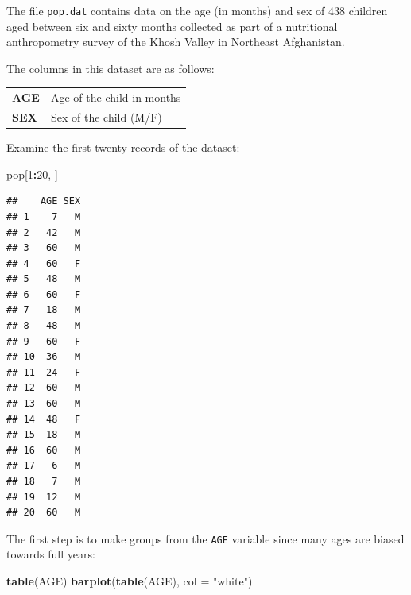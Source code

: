 \documentclass[12pt,a4paper]{book}
\newenvironment{Shaded}{\begin{snugshade}}{\end{snugshade}}
\newcommand{\KeywordTok}[1]{\textcolor[rgb]{0.13,0.29,0.53}{\textbf{#1}}}
\newcommand{\DataTypeTok}[1]{\textcolor[rgb]{0.13,0.29,0.53}{#1}}
\newcommand{\DecValTok}[1]{\textcolor[rgb]{0.00,0.00,0.81}{#1}}
\newcommand{\StringTok}[1]{\textcolor[rgb]{0.31,0.60,0.02}{#1}}
\newcommand{\OperatorTok}[1]{\textcolor[rgb]{0.81,0.36,0.00}{\textbf{#1}}}
\newcommand{\NormalTok}[1]{#1}
\theoremstyle{definition}
\theoremstyle{definition}
\theoremstyle{definition}
\theoremstyle{remark}
\begin{document}
The file \texttt{pop.dat} contains data on the age (in months) and sex
of 438 children aged between six and sixty months collected as part of a
nutritional anthropometry survey of the Khosh Valley in Northeast
Afghanistan.

The columns in this dataset are as follows:

\begin{longtable}[]{@{}ll@{}}
\toprule
\begin{minipage}[t]{0.14\columnwidth}\raggedright
\textbf{AGE}\strut
\end{minipage} & \begin{minipage}[t]{0.38\columnwidth}\raggedright
Age of the child in months\strut
\end{minipage}\tabularnewline
\begin{minipage}[t]{0.14\columnwidth}\raggedright
\textbf{SEX}\strut
\end{minipage} & \begin{minipage}[t]{0.38\columnwidth}\raggedright
Sex of the child (M/F)\strut
\end{minipage}\tabularnewline
\bottomrule
\end{longtable}

Examine the first twenty records of the dataset:

\begin{Shaded}
\begin{Highlighting}[]
\NormalTok{pop[}\DecValTok{1}\OperatorTok{:}\DecValTok{20}\NormalTok{, ]}
\end{Highlighting}
\end{Shaded}

\begin{verbatim}
##    AGE SEX
## 1    7   M
## 2   42   M
## 3   60   M
## 4   60   F
## 5   48   M
## 6   60   F
## 7   18   M
## 8   48   M
## 9   60   F
## 10  36   M
## 11  24   F
## 12  60   M
## 13  60   M
## 14  48   F
## 15  18   M
## 16  60   M
## 17   6   M
## 18   7   M
## 19  12   M
## 20  60   M
\end{verbatim}

The first step is to make groups from the \texttt{AGE} variable since
many ages are biased towards full years:

\begin{Shaded}
\begin{Highlighting}[]
\KeywordTok{table}\NormalTok{(AGE)}
\KeywordTok{barplot}\NormalTok{(}\KeywordTok{table}\NormalTok{(AGE), }\DataTypeTok{col =} \StringTok{"white"}\NormalTok{)}
\end{Highlighting}
\end{Shaded}
\end{document}
